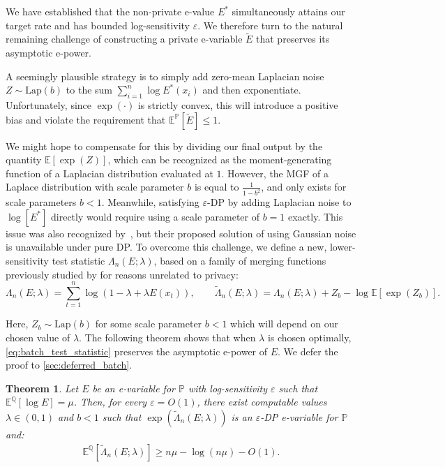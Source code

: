 \documentclass{article}
\newcommand{\Null}{\mathbb{P}}
\newcommand{\E}{\mathbb{E}}
\newcommand{\Alt}{\mathbb{Q}}
\newcommand{\eps}{\varepsilon}
\newtheorem{theorem}{Theorem}[section]
\begin{document}
We have established that the non-private e-value $E^*$ simultaneously attains our target rate and has bounded log-sensitivity $\eps$. We therefore turn to the natural remaining challenge of constructing a private e-variable $\tilde E$ that preserves its asymptotic e-power. 

A seemingly plausible strategy is to simply add zero-mean Laplacian noise $Z \sim \mathrm{Lap}(b)$ to the sum $\sum_{i=1}^n \log E^*(x_i)$ and then exponentiate. Unfortunately, since $\exp(\cdot)$ is strictly convex, this will introduce a positive bias and violate the requirement that $\E^\Null[\tilde E] \leq 1$. 

We might hope to compensate for this by dividing our final output by the quantity $\E[\exp(Z)]$, which can be recognized as the moment-generating function of a Laplacian distribution evaluated at $1$. 
However, the MGF of a Laplace distribution with scale parameter $b$ is equal to $\frac{1}{1-b^2}$, and only exists for scale parameters $b<1$. Meanwhile, satisfying $\eps$-DP by adding Laplacian noise to $\log[E^*]$ directly would require using a scale parameter of $b=1$ exactly. 
This issue was also recognized by~\citet{csillagDifferentiallyPrivateEValues2025a}, but their proposed solution of using Gaussian noise is unavailable under pure DP. 
To overcome this challenge, we define a new, lower-sensitivity test statistic $\Lambda_n(E;\lambda)$, based on a family of merging functions previously studied by \citet{vovkMergingSequentialEvalues2024} for reasons unrelated to privacy:
    \begin{equation}
        \Lambda_n(E;\lambda) = \sum_{t = 1}^n \log (1-\lambda+\lambda  E(x_t)), 
        \qquad 
        \tilde \Lambda_n(E;\lambda) = \Lambda_n(E;\lambda) + Z_b - \log \mathbb{E}[\exp(Z_b)].
        \label{eq:batch_test_statistic}
    \end{equation}

    Here, $Z_b \sim \mathrm{Lap}(b)$ for some scale parameter $b < 1$ which will depend on our chosen value of $\lambda$. The following theorem shows that when $\lambda$ is chosen optimally, \cref{eq:batch_test_statistic} preserves the asymptotic e-power of $E$. We defer the proof to \cref{sec:deferred_batch}.

\begin{theorem}\label{thm:basic-batch}
   Let $E$ be an e-variable for $\Null$ with log-sensitivity $\eps$ such that $\E^\Alt[\log E] = \mu$. Then, for every $\eps = O(1)$, there exist computable values $\lambda \in (0,1)$ and $b<1$ such that $\exp(\tilde \Lambda_n(E;\lambda))$ is an $\eps$-DP e-variable for $\Null$ and:
    \begin{align*}
        \E^\Alt[\tilde\Lambda_n(E;\lambda)] \geq n\mu - \log(n \mu) - O(1).
    \end{align*}
\end{theorem}
\end{document}
